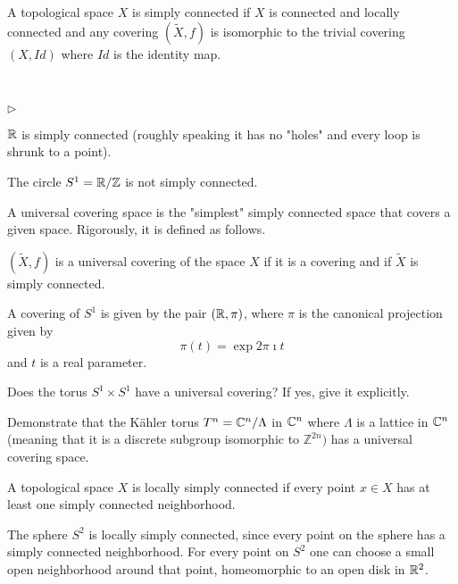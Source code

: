 \begin{definition}
A topological space $X$ is simply connected if $X$ is connected and locally connected and any covering $(\tilde X,f)$ is isomorphic to the trivial covering $(X,Id)$ where $Id$ is the identity map.
\end{definition}
  
 \begin{example}
\

\begin{list}{$\triangleright$}{}
\item $\mathbb{R}$ is simply connected (roughly speaking it has no "holes" and every loop is shrunk to a point).
\item The circle $S^{1}=\mathbb{R}/\mathbb{Z}$ is not simply connected.
\end{list}
\end{example}


A universal covering space is the "simplest" simply connected space that covers a given space. Rigorously, it is defined as follows.
\begin{definition}
$(\tilde X,f)$ is a universal covering of the space $X$ if it is a covering and if $\tilde X$ is simply connected.
\end{definition}
\begin{example}
  A covering of $S^{1}$ is given by the pair $(\mathbb{R},\pi)$, where $\pi$ is the canonical projection given by \[\pi(t)=\exp{2\pi\imath t}\] and $t$ is a real parameter.    
\end{example}

\begin{ex}\label{Ex:10}
Does the torus $S^1\times S^1$ have a universal covering? If yes, give it explicitly. 
\, 

Demonstrate that the Kähler torus $T^n=\mathbb{C}^n/\Lambda$ in $\mathbb{C}^n$ where $\Lambda$ is a lattice in $\mathbb{C}^n$ (meaning that it is a discrete subgroup isomorphic to $\mathbb{Z}^{2n})$  has a universal covering space.
\end{ex}

\begin{definition}
A topological space $X$ is locally simply connected if every point $x\in X$ has at least one simply connected neighborhood.
\end{definition}
\begin{example}
    The sphere $S^2$ is locally simply connected, since every point on the sphere has a simply connected neighborhood. For every point on $S^2$ one can choose a small open neighborhood around that point, homeomorphic to an open disk in $\mathbb{R}^2$. 
\end{example}

